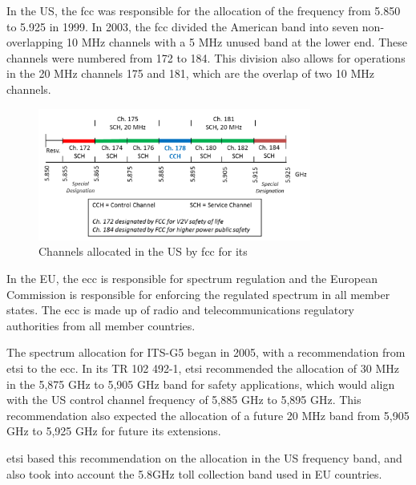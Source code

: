 In the US, the \gls{fcc} was responsible for the allocation of the frequency from 5.850 to 5.925 in 1999. In 2003, the \gls{fcc} divided the American band into seven non-overlapping 10 MHz channels with a 5 MHz unused band at the lower end. These channels were numbered from 172 to 184. This division also allows for operations in the 20 MHz channels 175 and 181, which are the overlap of two 10 MHz channels\cite{harri_multi-channel_2015}.

\begin{figure}[htbp]
    \centering
    \includegraphics[width=0.8\textwidth]{Chapters/Figures/VANETs/WAVE_channels.png}
   	\caption{Channels allocated in the US by \gls{fcc} for \gls{its}~\cite{harri_multi-channel_2015}}
   	\label{fig:WAVE_channels}
\end{figure}

In the EU, the \gls{ecc} is responsible for spectrum regulation and the European Commission is responsible for enforcing the regulated spectrum in all member states. The \gls{ecc} is made up of radio and telecommunications regulatory authorities from all member countries\cite{harri_multi-channel_2015}\cite{asselin-miller_study_2016}.

The spectrum allocation for ITS-G5 began in 2005, with a recommendation from \gls{etsi} to the \gls{ecc}. In its TR 102 492-1\cite{etsi_electromagnetic_2005}, \gls{etsi} recommended the allocation of 30 MHz in the 5,875 GHz to 5,905 GHz band for safety applications, which would align with the US control channel frequency of 5,885 GHz to 5,895 GHz. This recommendation also expected the allocation of a future 20 MHz band from 5,905 GHz to 5,925 GHz for future \gls{its} extensions\cite{harri_multi-channel_2015}\cite{asselin-miller_study_2016}.

\gls{etsi} based this recommendation on the allocation in the US frequency band, and also took into account the 5.8GHz toll collection band used in EU countries\cite{harri_multi-channel_2015}\cite{asselin-miller_study_2016}.

